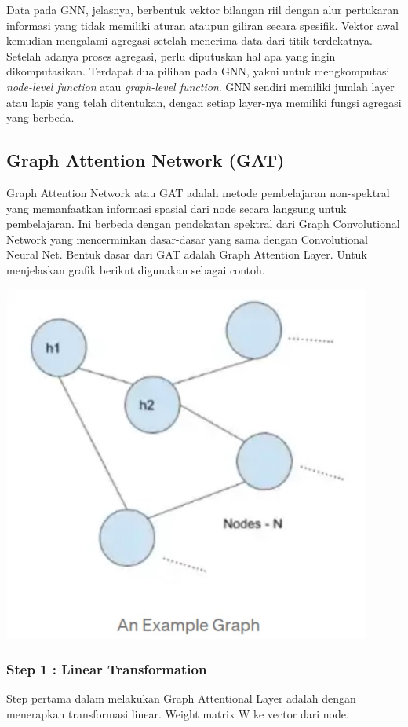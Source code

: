 \documentclass{article}
\begin{document}
Data pada GNN, jelasnya, berbentuk vektor bilangan riil dengan alur pertukaran informasi yang tidak memiliki aturan ataupun giliran secara spesifik. Vektor awal kemudian mengalami agregasi setelah menerima data dari titik terdekatnya. Setelah adanya proses agregasi, perlu diputuskan hal apa yang ingin dikomputasikan. Terdapat dua pilihan pada GNN, yakni untuk mengkomputasi \textit{node-level function} atau \textit{graph-level function}. GNN sendiri memiliki jumlah layer atau lapis yang telah ditentukan, dengan setiap layer-nya memiliki fungsi agregasi yang berbeda.

\subsection{Graph Attention Network (GAT)}
Graph Attention Network atau GAT adalah metode pembelajaran non-spektral yang memanfaatkan informasi spasial dari node secara langsung untuk pembelajaran. Ini berbeda dengan pendekatan spektral dari Graph Convolutional Network yang mencerminkan dasar-dasar yang sama dengan Convolutional Neural Net. Bentuk dasar dari GAT adalah Graph Attention Layer. Untuk menjelaskan grafik berikut digunakan sebagai contoh.

\begin{center}
\includegraphics[width=4.79167in,height=4.63542in]{Picture/Fig1.jpg}
\end{center}

\subsubsection{Step 1 : Linear Transformation}
Step pertama dalam melakukan Graph Attentional Layer adalah dengan menerapkan transformasi linear. Weight matrix W ke vector dari node.
\end{document}
